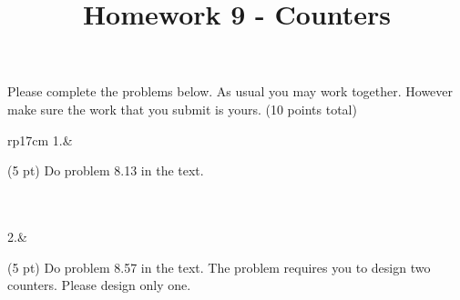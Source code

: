 \documentclass{article}
\title{Homework 9 - Counters}
\date{}
\begin{document}
\maketitle
Please complete the problems below.  As usual you may work together.  However make sure the work that you submit is yours. (10 points total)
\begin{longtable}[l]{rp{17cm}}
1.&\begin{minipage}[t]{\linewidth}(5 pt) Do problem 8.13 in the text. \\ \\

\vspace{12cm
}
\end{minipage}\\
\medskip
2.&\begin{minipage}[t]{\linewidth}(5 pt) Do problem 8.57 in the text.  The problem requires you to design two counters.  Please design only one.\\ \\

\vspace{12cm
}
\end{minipage}\\
\medskip
\end{longtable}
\end{document}
